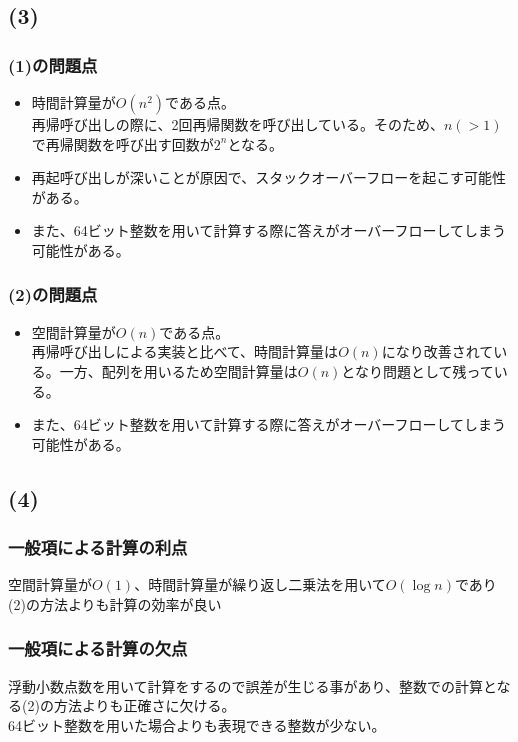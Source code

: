 \documentclass[a4paper,12pt,xelatex,ja=standard]{bxjsarticle}
\begin{document}
  \subsection*{(3)}
    \subsubsection*{(1)の問題点}
    \begin{itemize}
      \item 時間計算量が\(O(n^2)\)である点。\\
        再帰呼び出しの際に、2回再帰関数を呼び出している。そのため、\(n (> 1)\)で再帰関数を呼び出す回数が\(2^n\)となる。
      \item 再起呼び出しが深いことが原因で、スタックオーバーフローを起こす可能性がある。
      \item また、64ビット整数を用いて計算する際に答えがオーバーフローしてしまう可能性がある。
    \end{itemize}
    \subsubsection*{(2)の問題点}
    \begin{itemize}
      \item 空間計算量が\(O(n)\)である点。\\
        再帰呼び出しによる実装と比べて、時間計算量は\(O(n)\)になり改善されている。一方、配列を用いるため空間計算量は\(O(n)\)となり問題として残っている。
      \item また、64ビット整数を用いて計算する際に答えがオーバーフローしてしまう可能性がある。
    \end{itemize}

  \subsection*{(4)}
    \subsubsection*{一般項による計算の利点}
    空間計算量が\(O(1)\)、時間計算量が繰り返し二乗法を用いて\(O(\log n)\)であり(2)の方法よりも計算の効率が良い
    \subsubsection*{一般項による計算の欠点}
    浮動小数点数を用いて計算をするので誤差が生じる事があり、整数での計算となる(2)の方法よりも正確さに欠ける。\\
    64ビット整数を用いた場合よりも表現できる整数が少ない。
\end{document}
